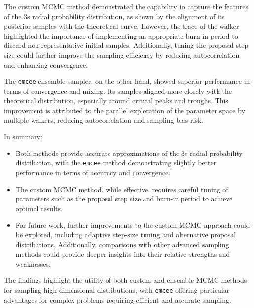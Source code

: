 \documentclass[twocolumn, 11pt]{article}
\begin{document}
The custom MCMC method demonstrated the capability to capture the features of the 3s radial probability distribution, as shown by the alignment of its posterior samples with the theoretical curve. However, the trace of the walker highlighted the importance of implementing an appropriate burn-in period to discard non-representative initial samples. Additionally, tuning the proposal step size could further improve the sampling efficiency by reducing autocorrelation and enhancing convergence.

The \texttt{emcee} ensemble sampler, on the other hand, showed superior performance in terms of convergence and mixing. Its samples aligned more closely with the theoretical distribution, especially around critical peaks and troughs. This improvement is attributed to the parallel exploration of the parameter space by multiple walkers, reducing autocorrelation and sampling bias risk.

In summary:
\begin{itemize}
    \item Both methods provide accurate approximations of the 3s radial probability distribution, with the \texttt{emcee} method demonstrating slightly better performance in terms of accuracy and convergence.
    \item The custom MCMC method, while effective, requires careful tuning of parameters such as the proposal step size and burn-in period to achieve optimal results.
    \item For future work, further improvements to the custom MCMC approach could be explored, including adaptive step-size tuning and alternative proposal distributions. Additionally, comparisons with other advanced sampling methods could provide deeper insights into their relative strengths and weaknesses.
\end{itemize}

The findings highlight the utility of both custom and ensemble MCMC methods for sampling high-dimensional distributions, with \texttt{emcee} offering particular advantages for complex problems requiring efficient and accurate sampling.
\end{document}
